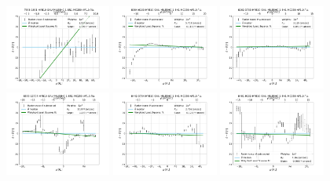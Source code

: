 \begin{figure}
    \centering
    \includegraphics[width=0.31\textwidth]{Images/WLSFITS/CC0/7958-1901.png}
    \includegraphics[width=0.31\textwidth]{Images/WLSFITS/CC0/8084-6103.png}
    \includegraphics[width=0.31\textwidth]{Images/WLSFITS/CC0/8262-3703.png}
    \includegraphics[width=0.31\textwidth]{Images/WLSFITS/CC0/8335-12704.png}
    \includegraphics[width=0.31\textwidth]{Images/WLSFITS/CC0/8442-3704.png}
    \includegraphics[width=0.31\textwidth]{Images/WLSFITS/CC0/8461-9102.png}

\end{figure}
